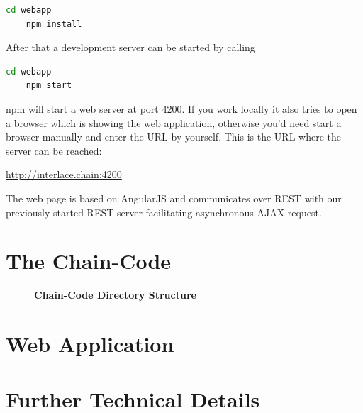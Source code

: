\begin{lstlisting}[language=bash]
	cd webapp
	npm install
\end{lstlisting}

After that a development server can be started by calling

\begin{lstlisting}[language=bash]
	cd webapp
	npm start
\end{lstlisting}

npm will start a web server at port 4200. If you work locally it also tries to open a browser which is showing the web application, otherwise you'd need start a browser manually and enter the URL by yourself. This is the URL where the server can be reached:

\url{http://interlace.chain:4200}

The web page is based on AngularJS and communicates over REST with our previously started REST server facilitating asynchronous AJAX-request.

\section{The Chain-Code}
\label{sec:chain-code}


\begin{figure}[htbp]
\centering
\begin{minipage}{5cm}
\end{minipage}
\caption{\bf\small Chain-Code Directory Structure}
\label{fig:chain-structure}
\end{figure}




\section{Web Application}
\label{sec:webapp}


\section{Further Technical Details}
\label{sec:technical-details}

